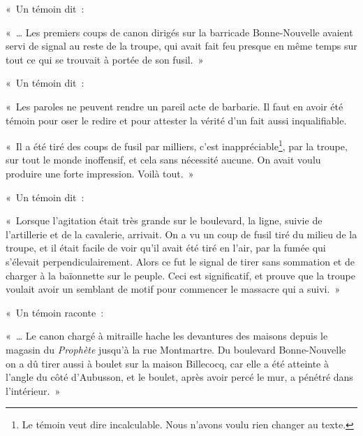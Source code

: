 \documentclass[french,twoside]{book} %
\newenvironment{quoteblock}%
  {\begin{quoting}}
  {\end{quoting}}
\newenvironment{quotebar}{%
    \def\FrameCommand{{\color{rubric!10!}\vrule width 0.5em} \hspace{0.9em}}%
    \def\OuterFrameSep{\itemsep} %
    \MakeFramed {\advance\hsize-\width \FrameRestore}
  }%
  {%
    \endMakeFramed
  }
\renewenvironment{quoteblock}%
  {%
    \savenotes
    \setstretch{0.9}
    \normalfont
    \begin{quotebar}
  }
  {%
    \end{quotebar}
    \spewnotes
  }
\begin{document}
\noindent « Un témoin dit :\par

\begin{quoteblock}
 \noindent « … Les premiers coups de canon dirigés sur la barricade Bonne-Nouvelle avaient servi de signal au reste de la troupe, qui avait fait feu presque en même temps sur tout ce qui se trouvait à portée de son fusil. »
 \end{quoteblock}

\noindent « Un témoin dit :\par

\begin{quoteblock}
 \noindent « Les paroles ne peuvent rendre un pareil acte de barbarie. Il faut en avoir été témoin pour oser le redire et pour attester la vérité d’un fait aussi inqualifiable.\par
 « Il a été tiré des coups de fusil par milliers, c’est inappréciable\footnote{Le témoin veut dire incalculable. Nous n’avons voulu rien changer au texte.}, par la troupe, sur tout le monde inoffensif, et cela sans nécessité aucune. On avait voulu produire une forte impression. Voilà tout. »
 \end{quoteblock}

\noindent « Un témoin dit :\par

\begin{quoteblock}
 \noindent « Lorsque l’agitation était très grande sur le boulevard, la ligne, suivie de l’artillerie et de la cavalerie, arrivait. On a vu un coup de fusil tiré du milieu de la troupe, et il était facile de voir qu’il avait été tiré en l’air, par la fumée qui s’élevait perpendiculairement. Alors ce fut le signal de tirer sans sommation et de charger à la baïonnette sur le peuple. Ceci est significatif, et prouve que la troupe voulait avoir un semblant de motif pour commencer le massacre qui a suivi. »
 \end{quoteblock}

\noindent « Un témoin raconte :\par

\begin{quoteblock}
 \noindent « … Le canon chargé à mitraille hache les devantures des maisons depuis le magasin du \emph{Prophète} jusqu’à la rue Montmartre. Du boulevard Bonne-Nouvelle on a dû tirer aussi à boulet sur la maison Billecocq, car elle a été atteinte à l’angle du côté d’Aubusson, et le boulet, après avoir percé le mur, a pénétré dans l’intérieur. »
 \end{quoteblock}
\end{document}
